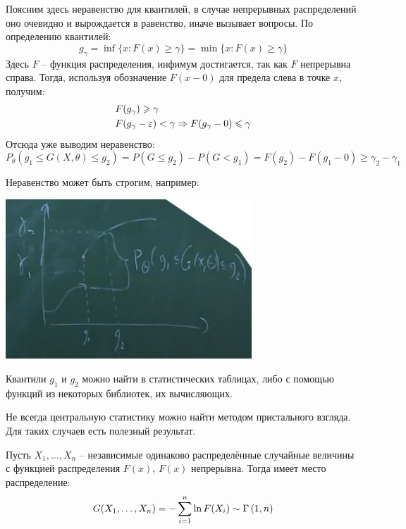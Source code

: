 \begin{note}
    Поясним здесь неравенство для квантилей, в случае непрерывных распределений оно очевидно и вырождается в равенство, иначе вызывает вопросы. По определению квантилей:
    \[
        g_\gamma = \inf \{x : F(x) \ge \gamma\} = \min \{x : F(x) \ge \gamma\}
    \]    
    Здесь $F$ -- функция распределения, инфимум достигается, так как $F$ непрерывна справа. Тогда, используя обозначение $F(x-0)$ для предела слева в точке $x$, получим:
    \begin{align*}
        & F(g_\gamma) \geqslant \gamma
        \\
        & F(g_\gamma - \varepsilon) < \gamma \Rightarrow F(g_\gamma - 0) \leqslant \gamma
    \end{align*}
    Отсюда уже выводим неравенство:
    \[
        P_\theta(g_1 \le G(X, \theta) \le g_2) = P(G \le g_2) - P(G < g_1) = F(g_2) - F(g_1-0) \ge \gamma_2 - \gamma_1
    \]
\end{note}

\begin{note}
    Неравенство может быть строгим, например:
    
    \includegraphics[height=6cm]{images/picture2.png}
\end{note}

\begin{note}
    Квантили $g_1$ и $g_2$ можно найти в статистических таблицах, либо с помощью функций из некоторых библиотек, их вычисляющих.
\end{note}

\begin{note}
    Не всегда центральную статистику можно найти методом пристального взгляда. Для таких случаев есть полезный результат.
\end{note}

\begin{lemma}
    Пусть $X_1, \dots, X_n$ -- независимые одинаково распределённые случайные величины с функцией распределения $F(x)$, $F(x)$ непрерывна. Тогда имеет место распределение:
    \[
        G(X_1, \dots, X_n) = -\sum_{i=1}^n \ln F(X_i) \sim \Gamma \left(1, n\right)
    \]
\end{lemma}


